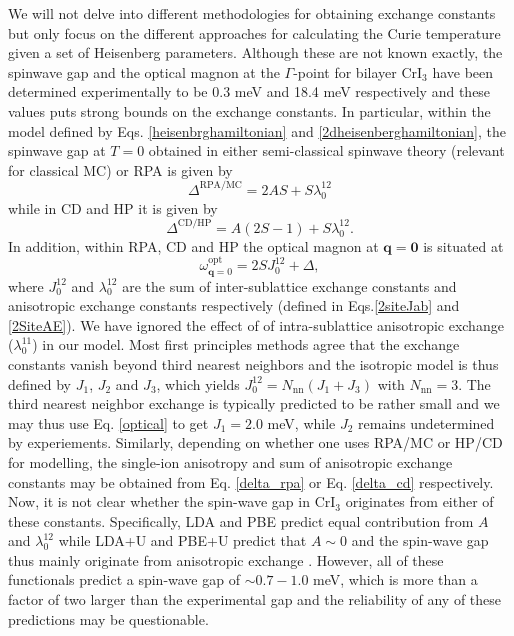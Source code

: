 \documentclass[aps,prb,reprint,floatfix,superscriptaddress]{revtex4-2}
\begin{document}
We will not delve into different methodologies for obtaining exchange constants but only focus on the different approaches for calculating the Curie temperature given a set of Heisenberg parameters. Although these are not known exactly, the spinwave gap and the optical magnon at the $\Gamma$-point for bilayer CrI$_3$ have been determined experimentally to be 0.3 meV and 18.4 meV respectively \cite{Cenker2021} and these values puts strong bounds on the exchange constants. In particular, within the model defined by Eqs. \eqref{heisenbrghamiltonian} and \eqref{2dheisenberghamiltonian}, the spinwave gap at $T=0$ obtained in either semi-classical spinwave theory (relevant for classical MC) or RPA is given by
\begin{equation}\label{delta_rpa}
    \Delta^\mathrm{RPA/MC} = 2AS + S\lambda^{12}_0
\end{equation}
while in CD and HP it is given by
\begin{equation}\label{delta_cd}
    \Delta^\mathrm{CD/HP} = A(2S-1) + S\lambda^{12}_0.
\end{equation}
In addition, within RPA, CD and HP the optical magnon at $\mathbf{q=0}$ is situated at
\begin{equation}\label{optical}
    \omega^\mathrm{opt}_{\mathbf{q}=0} = 2S J^{12}_0 + \Delta,
\end{equation}
where $J^{12}_0$ and $\lambda^{12}_0$ are the sum of inter-sublattice exchange constants and anisotropic exchange constants respectively (defined in Eqs.\eqref{2siteJab} and \eqref{2SiteAE}). We have ignored the effect of of intra-sublattice anisotropic exchange ($\lambda^{11}_0$) in our model. Most first principles methods agree that the exchange constants vanish beyond third nearest neighbors and the isotropic model is thus defined by $J_1$, $J_2$ and $J_3$, which yields $J^{12}_0=N_\mathrm{nn}(J_1+J_3)$ with $N_\mathrm{nn}=3$. The third nearest neighbor exchange is typically predicted to be rather small and we may thus use Eq. \eqref{optical} to get $J_1=2.0$ meV, while $J_2$ remains undetermined by experiements. Similarly, depending on whether one uses RPA/MC or HP/CD for modelling, the single-ion anisotropy and sum of anisotropic exchange constants may be obtained from Eq. \eqref{delta_rpa} or Eq. \eqref{delta_cd} respectively. Now, it is not clear whether the spin-wave gap in CrI$_3$ originates from either of these constants. Specifically, LDA and PBE predict equal contribution from $A$ and $\lambda^{12}_0$ while LDA+U and PBE+U predict that $A\sim0$ and the spin-wave gap thus mainly originate from anisotropic exchange \cite{Olsen2019}. However, all of these functionals predict a spin-wave gap of $\sim0.7-1.0$ meV, which is more than a factor of two larger than the experimental gap and the reliability of any of these predictions may be questionable.
\end{document}
